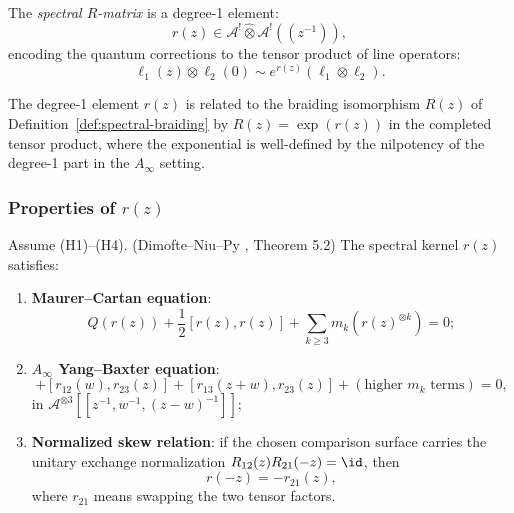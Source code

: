 \begin{definition}
The \emph{spectral $R$-matrix} is a degree-1 element:
\begin{equation}
r(z) \in \mathcal{A}^! \widehat{\otimes} \mathcal{A}^!((z^{-1})),
\end{equation}
encoding the quantum corrections to the tensor product of line operators:
\begin{equation}
\ell_1(z) \otimes \ell_2(0) \sim e^{r(z)} (\ell_1 \otimes \ell_2).
\end{equation}
\end{definition}

\begin{remark}
The degree-1 element $r(z)$ is related to the braiding isomorphism $R(z)$ of Definition~\ref{def:spectral-braiding} by $R(z) = \exp(r(z))$ in the completed tensor product, where the exponential is well-defined by the nilpotency of the degree-1 part in the $A_\infty$ setting.
\end{remark}

\subsubsection{Properties of $r(z)$}

\begin{theorem}
Assume \textrm{(H1)--(H4)}.
(Dimofte--Niu--Py \cite{DNP25}, Theorem 5.2) The spectral kernel $r(z)$ satisfies:
\begin{enumerate}[label=(\roman*)]
\item \textbf{Maurer--Cartan equation}:
\begin{equation}
Q(r(z)) + \frac{1}{2}[r(z), r(z)] + \sum_{k \geq 3} m_k(r(z)^{\otimes k}) = 0;
\end{equation}

\item \textbf{$A_\infty$ Yang--Baxter equation}:
\begin{equation}
[r_{12}(w), r_{13}(z+w)] + [r_{12}(w), r_{23}(z)] + [r_{13}(z+w), r_{23}(z)] + (\text{higher $m_k$ terms}) = 0,
\end{equation}
in $\mathcal{A}^{\otimes 3}[[z^{-1}, w^{-1}, (z-w)^{-1}]]$;

\item \textbf{Normalized skew relation}: if the chosen comparison
surface carries the unitary exchange normalization
\(R_{12}(z)R_{21}(-z)=\id\), then
\begin{equation}
r(-z) = -r_{21}(z),
\end{equation}
where $r_{21}$ means swapping the two tensor factors.
\end{enumerate}
\end{theorem}

